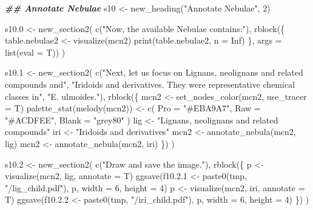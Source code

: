 \documentclass[
]{article}
\newenvironment{Shaded}{\begin{snugshade}}{\end{snugshade}}
\newcommand{\AttributeTok}[1]{\textcolor[rgb]{0.77,0.63,0.00}{#1}}
\newcommand{\ConstantTok}[1]{\textcolor[rgb]{0.00,0.00,0.00}{#1}}
\newcommand{\DecValTok}[1]{\textcolor[rgb]{0.00,0.00,0.81}{#1}}
\newcommand{\DocumentationTok}[1]{\textcolor[rgb]{0.56,0.35,0.01}{\textbf{\textit{#1}}}}
\newcommand{\FloatTok}[1]{\textcolor[rgb]{0.00,0.00,0.81}{#1}}
\newcommand{\FunctionTok}[1]{\textcolor[rgb]{0.00,0.00,0.00}{#1}}
\newcommand{\NormalTok}[1]{#1}
\newcommand{\OtherTok}[1]{\textcolor[rgb]{0.56,0.35,0.01}{#1}}
\newcommand{\StringTok}[1]{\textcolor[rgb]{0.31,0.60,0.02}{#1}}
\begin{document}
\begin{Shaded}
\begin{Highlighting}[]
\DocumentationTok{\#\# Annotate Nebulae}
\NormalTok{s10 }\OtherTok{\textless{}{-}} \FunctionTok{new\_heading}\NormalTok{(}\StringTok{"Annotate Nebulae"}\NormalTok{, }\DecValTok{2}\NormalTok{)}

\NormalTok{s10}\FloatTok{.0} \OtherTok{\textless{}{-}} \FunctionTok{new\_section2}\NormalTok{(}
  \FunctionTok{c}\NormalTok{(}\StringTok{"Now, the available Nebulae contains:"}\NormalTok{),}
  \FunctionTok{rblock}\NormalTok{(\{}
\NormalTok{    table.nebulae2 }\OtherTok{\textless{}{-}} \FunctionTok{visualize}\NormalTok{(mcn2)}
    \FunctionTok{print}\NormalTok{(table.nebulae2, }\AttributeTok{n =} \ConstantTok{Inf}\NormalTok{)}
\NormalTok{  \}, }\AttributeTok{args =} \FunctionTok{list}\NormalTok{(}\AttributeTok{eval =}\NormalTok{ T))}
\NormalTok{)}

\NormalTok{s10}\FloatTok{.1} \OtherTok{\textless{}{-}} \FunctionTok{new\_section2}\NormalTok{(}
  \FunctionTok{c}\NormalTok{(}\StringTok{"Next, let us focus on \textquotesingle{}Lignans, neolignans and related compounds\textquotesingle{} and"}\NormalTok{,}
    \StringTok{"\textquotesingle{}Iridoids and derivatives\textquotesingle{}. They were representative chemical classes in"}\NormalTok{,}
    \StringTok{"E. ulmoides."}\NormalTok{),}
  \FunctionTok{rblock}\NormalTok{(\{}
\NormalTok{    mcn2 }\OtherTok{\textless{}{-}} \FunctionTok{set\_nodes\_color}\NormalTok{(mcn2, }\AttributeTok{use\_tracer =}\NormalTok{ T)}
    \FunctionTok{palette\_stat}\NormalTok{(}\FunctionTok{melody}\NormalTok{(mcn2)) }\OtherTok{\textless{}{-}} \FunctionTok{c}\NormalTok{(}
      \AttributeTok{Pro =} \StringTok{"\#EBA9A7"}\NormalTok{, }\AttributeTok{Raw =} \StringTok{"\#ACDFEE"}\NormalTok{, }\AttributeTok{Blank =} \StringTok{"grey80"}
\NormalTok{    )}
\NormalTok{    lig }\OtherTok{\textless{}{-}} \StringTok{"Lignans, neolignans and related compounds"}
\NormalTok{    iri }\OtherTok{\textless{}{-}} \StringTok{"Iridoids and derivatives"}
\NormalTok{    mcn2 }\OtherTok{\textless{}{-}} \FunctionTok{annotate\_nebula}\NormalTok{(mcn2, lig)}
\NormalTok{    mcn2 }\OtherTok{\textless{}{-}} \FunctionTok{annotate\_nebula}\NormalTok{(mcn2, iri)}
\NormalTok{  \})}
\NormalTok{)}

\NormalTok{s10}\FloatTok{.2} \OtherTok{\textless{}{-}} \FunctionTok{new\_section2}\NormalTok{(}
  \FunctionTok{c}\NormalTok{(}\StringTok{"Draw and save the image."}\NormalTok{),}
  \FunctionTok{rblock}\NormalTok{(\{}
\NormalTok{    p }\OtherTok{\textless{}{-}} \FunctionTok{visualize}\NormalTok{(mcn2, lig, }\AttributeTok{annotate =}\NormalTok{ T)}
    \FunctionTok{ggsave}\NormalTok{(f10.}\FloatTok{2.1} \OtherTok{\textless{}{-}} \FunctionTok{paste0}\NormalTok{(tmp, }\StringTok{"/lig\_child.pdf"}\NormalTok{), p, }\AttributeTok{width =} \DecValTok{6}\NormalTok{, }\AttributeTok{height =} \DecValTok{4}\NormalTok{)}
\NormalTok{    p }\OtherTok{\textless{}{-}} \FunctionTok{visualize}\NormalTok{(mcn2, iri, }\AttributeTok{annotate =}\NormalTok{ T)}
    \FunctionTok{ggsave}\NormalTok{(f10.}\FloatTok{2.2} \OtherTok{\textless{}{-}} \FunctionTok{paste0}\NormalTok{(tmp, }\StringTok{"/iri\_child.pdf"}\NormalTok{), p, }\AttributeTok{width =} \DecValTok{6}\NormalTok{, }\AttributeTok{height =} \DecValTok{4}\NormalTok{)}
\NormalTok{  \})}
\NormalTok{)}


\end{Highlighting}
\end{Shaded}
\end{document}
